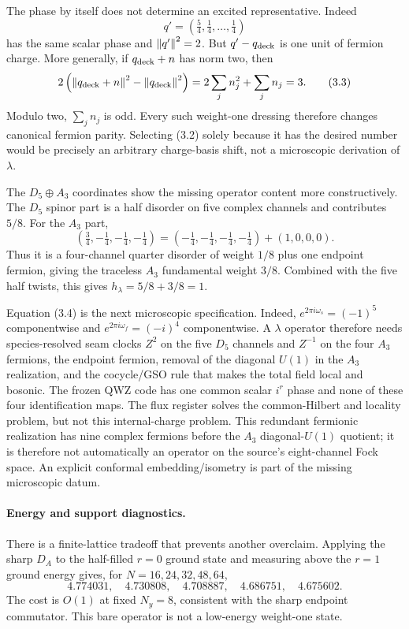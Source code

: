 The phase by itself does not determine an excited representative.  Indeed
\[
 q'=\left(\tfrac54,\tfrac14,\ldots,\tfrac14\right)
\tag{3.2}
\]
has the same scalar phase and $\left\lVert q'\right\rVert^2=2$.  But $q'-q_{\rm deck}$ is one
unit of fermion charge.  More generally, if $q_{\rm deck}+n$ has norm two,
then
\[
 2\left(\left\lVert q_{\rm deck}+n\right\rVert^2-\left\lVert q_{\rm deck}\right\rVert^2\right)
 =2\sum_jn_j^2+\sum_jn_j=3.
\tag{3.3}
\]
Modulo two, $\sum_jn_j$ is odd.  Every such weight-one dressing therefore
changes canonical fermion parity.  Selecting (3.2) solely because it has the
desired number would be precisely an arbitrary charge-basis shift, not a
microscopic derivation of $\lambda$.

The $D_5\oplus A_3$ coordinates show the missing operator content more
constructively.  The $D_5$ spinor part is a half disorder on five complex
channels and contributes $5/8$.  For the $A_3$ part,
\[
 \left(\tfrac34,-\tfrac14,-\tfrac14,-\tfrac14\right)
 =\left(-\tfrac14,-\tfrac14,-\tfrac14,-\tfrac14\right)+(1,0,0,0).
\tag{3.4}
\]
Thus it is a four-channel quarter disorder of weight $1/8$ plus one endpoint
fermion, giving the traceless $A_3$ fundamental weight $3/8$.  Combined with
the five half twists, this gives $h_\lambda=5/8+3/8=1$.

Equation (3.4) is the next microscopic specification.  Indeed,
$e^{2\pi i\omega_s}=(-1)^5$ componentwise and
$e^{2\pi i\omega_f}=(-i)^4$ componentwise.  A $\lambda$ operator therefore
needs species-resolved seam clocks $Z^2$ on the five $D_5$ channels and
$Z^{-1}$ on the four $A_3$ fermions, the endpoint fermion, removal of the
diagonal $U(1)$ in the $A_3$ realization, and the cocycle/GSO rule that makes
the total field local and bosonic.  The frozen QWZ code has one common scalar
$i^r$ phase and none of these four identification maps.  The flux register
solves the common-Hilbert and locality problem, but not this internal-charge
problem.  This redundant fermionic realization has nine complex fermions
before the $A_3$ diagonal-$U(1)$ quotient; it is therefore not automatically
an operator on the source's eight-channel Fock space.  An explicit conformal
embedding/isometry is part of the missing microscopic datum.

\paragraph{Energy and support diagnostics.}

There is a finite-lattice tradeoff that prevents another overclaim.
Applying the sharp $D_A$ to the half-filled $r=0$ ground state and measuring
above the $r=1$ ground energy gives, for $N=16,24,32,48,64$,
\[
 4.774031,\quad4.730808,\quad4.708887,\quad4.686751,\quad4.675602.
\tag{4.1}
\]
The cost is $O(1)$ at fixed $N_y=8$, consistent with the sharp endpoint
commutator.  This bare operator is not a low-energy weight-one state.

